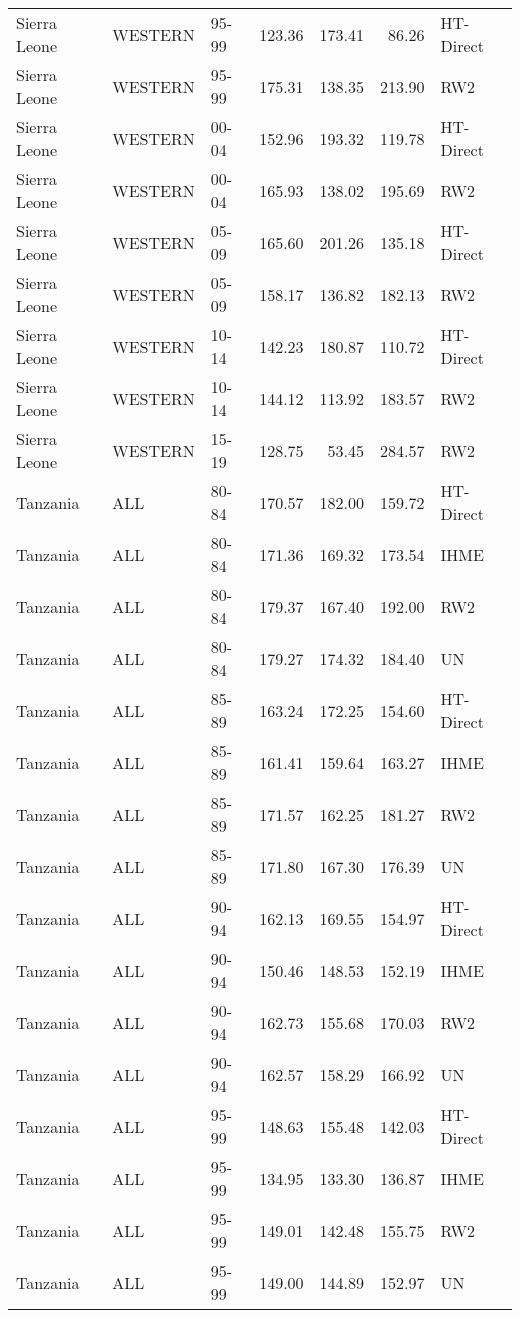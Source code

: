 \begin{longtable}{lllrrrl}
  Sierra Leone & WESTERN & 95-99 & 123.36 & 173.41 & 86.26 & HT-Direct \\ 
  Sierra Leone & WESTERN & 95-99 & 175.31 & 138.35 & 213.90 & RW2 \\ 
  Sierra Leone & WESTERN & 00-04 & 152.96 & 193.32 & 119.78 & HT-Direct \\ 
  Sierra Leone & WESTERN & 00-04 & 165.93 & 138.02 & 195.69 & RW2 \\ 
  Sierra Leone & WESTERN & 05-09 & 165.60 & 201.26 & 135.18 & HT-Direct \\ 
  Sierra Leone & WESTERN & 05-09 & 158.17 & 136.82 & 182.13 & RW2 \\ 
  Sierra Leone & WESTERN & 10-14 & 142.23 & 180.87 & 110.72 & HT-Direct \\ 
  Sierra Leone & WESTERN & 10-14 & 144.12 & 113.92 & 183.57 & RW2 \\ 
  Sierra Leone & WESTERN & 15-19 & 128.75 & 53.45 & 284.57 & RW2 \\ 
  Tanzania & ALL & 80-84 & 170.57 & 182.00 & 159.72 & HT-Direct \\ 
  Tanzania & ALL & 80-84 & 171.36 & 169.32 & 173.54 & IHME \\ 
  Tanzania & ALL & 80-84 & 179.37 & 167.40 & 192.00 & RW2 \\ 
  Tanzania & ALL & 80-84 & 179.27 & 174.32 & 184.40 & UN \\ 
  Tanzania & ALL & 85-89 & 163.24 & 172.25 & 154.60 & HT-Direct \\ 
  Tanzania & ALL & 85-89 & 161.41 & 159.64 & 163.27 & IHME \\ 
  Tanzania & ALL & 85-89 & 171.57 & 162.25 & 181.27 & RW2 \\ 
  Tanzania & ALL & 85-89 & 171.80 & 167.30 & 176.39 & UN \\ 
  Tanzania & ALL & 90-94 & 162.13 & 169.55 & 154.97 & HT-Direct \\ 
  Tanzania & ALL & 90-94 & 150.46 & 148.53 & 152.19 & IHME \\ 
  Tanzania & ALL & 90-94 & 162.73 & 155.68 & 170.03 & RW2 \\ 
  Tanzania & ALL & 90-94 & 162.57 & 158.29 & 166.92 & UN \\ 
  Tanzania & ALL & 95-99 & 148.63 & 155.48 & 142.03 & HT-Direct \\ 
  Tanzania & ALL & 95-99 & 134.95 & 133.30 & 136.87 & IHME \\ 
  Tanzania & ALL & 95-99 & 149.01 & 142.48 & 155.75 & RW2 \\ 
  Tanzania & ALL & 95-99 & 149.00 & 144.89 & 152.97 & UN \\ 

\end{longtable}
